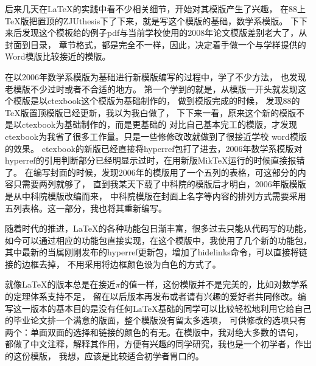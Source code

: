 \begin{preface}
后来几天在\LaTeX{}的实践中看不少相关细节，开始对其模版产生了兴趣，
在88上\TeX{}版把置顶的ZJUthesis下了下来，就是写这个模版的基础，数学系模版。
下下来后发现这个模板给的例子pdf与当前学校使用的2008年论文模版差别老大了，从封面到目录，
章节格式，都是完全不一样，因此，决定着手做一个与学样提供的Word模版比较接近的模版。

在以2006年数学系模版为基础进行新模版编写的过程中，学了不少方法，
也发现老模版不少过时或者不合适的地方。
第一个学到的就是，从模版一开头就发现这个模版是以ctexbook这个模版为基础制作的，
做到模版完成的时候，
发现88的\TeX{}版置顶模版已经更新，我以为我白做了，
下下来一看，原来这个新的模版不是以ctexbook为基础制作的，而是更基础的\LaTeXe\index{\LaTeX}
对比自己基本完工的模版，才发现ctexbook为我省了很多工作量。只是一些修修改改就做到了很接近学校
word模版的效果。
ctexbook的新版已经直接将hyperref包打了进去，2006年数学系模版对hyperref的引用判断部分已经明显示过时，在用新版MikTeX运行的时候直接报错了。
在编写封面的时候，发现2006年的模版用了一个五列的表格，可这部分的内容只需要两列就够了，
直到我某天下载了中科院的模版后才明白，2006年版模版是从中科院模版改编而来，
中科院模版在封面上名字等内容的排列方式需要采用五列表格。这一部分，我也将其重新编写。

随着时代的推进，\LaTeX{}的各种功能包日渐丰富，很多过去只能从\LaTeXe{}代码写的功能，
如今可以通过相应的功能包直接实现，在这个模版中，我使用了几个新的功能包，
其中最新的当属刚刚发布的hyperref更新包，增加了hidelinks命令，可以直接将链接的边框去掉，
不用采用将边框颜色设为白色的方式了。

就像\LaTeX{}的版本总是在接近$\pi$的值一样，这份模版并不是完美的，比如对数学系的定理体系支持不足，
留在以后版本再发布或者请有兴趣的爱好者共同修改。编写这一版本的基本目的是没有任何\LaTeX{}基础的同学可以比较轻松地利用它给自己的毕业论文排一个满意的版面，整个模版没有留太多选项，
可供修改的选项只有两个：单面双面的选择和链接的颜色的有无。在模版中，我对绝大多数的语句，
都做了中文注释，解释其作用，方便有兴趣的同学研究，我也是一个初学者，作出的这份模版，
我想，应该是比较适合初学者胃口的。

\end{preface}
